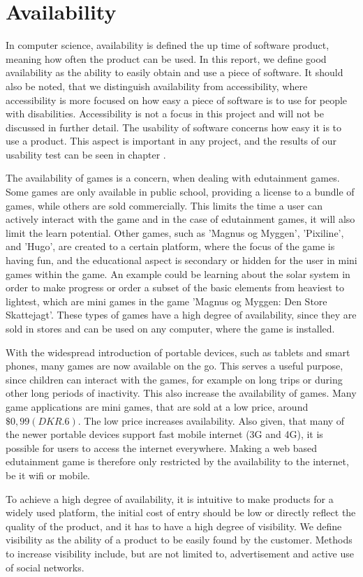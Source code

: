 \section{Availability}
\label{sec:availability}

In computer science, availability is defined the up time of software product, meaning how often the product can be used. \cite{defAvailability} In this report, we define good availability as the ability to easily obtain and use a piece of software. It should also be noted, that we distinguish availability from accessibility, where accessibility is more focused on how easy a piece of software is to use for people with disabilities. Accessibility is not a focus in this project and will not be discussed in further detail. The usability of software concerns how easy it is to use a product.\cite{defUsability} This aspect is important in any project, and the results of our usability test can be seen in chapter .

The availability of games is a concern, when dealing with edutainment games. Some games are only available in public school, providing a license to a bundle of games, while others are sold commercially. This limits the time a user can actively interact with the game and in the case of edutainment games, it will also limit the learn potential. Other games, such as 'Magnus og Myggen', 'Pixiline', and 'Hugo', are created to a certain platform, where the focus of the game is having fun, and the educational aspect is secondary or hidden for the user in mini games within the game. An example could be learning about the solar system in order to make progress or order a subset of the basic elements from heaviest to lightest, which are mini games in the game 'Magnus og Myggen: Den Store Skattejagt'. These types of games have a high degree of availability, since they are sold in stores and can be used on any computer, where the game is installed.

With the widespread introduction of portable devices, such as tablets and smart phones, many games are now available on the go. This serves a useful purpose, since children can interact with the games, for example on long trips or during other long periods of inactivity. This also increase the availability of games. Many game applications are mini games, that are sold at a low price, around $\$0,99 (DKR. 6)$. The low price increases availability. Also given, that many of the newer portable devices support fast mobile internet (3G and 4G), it is possible for users to access the internet everywhere. Making a web based edutainment game is therefore only restricted by the availability to the internet, be it wifi or mobile.

To achieve a high degree of availability, it is intuitive to make products for a widely used platform, the initial cost of entry should be low or directly reflect the quality of the product, and it has to have a high degree of visibility. We define visibility as the ability of a product to be easily found by the customer. Methods to increase visibility include, but are not limited to, advertisement and active use of social networks.